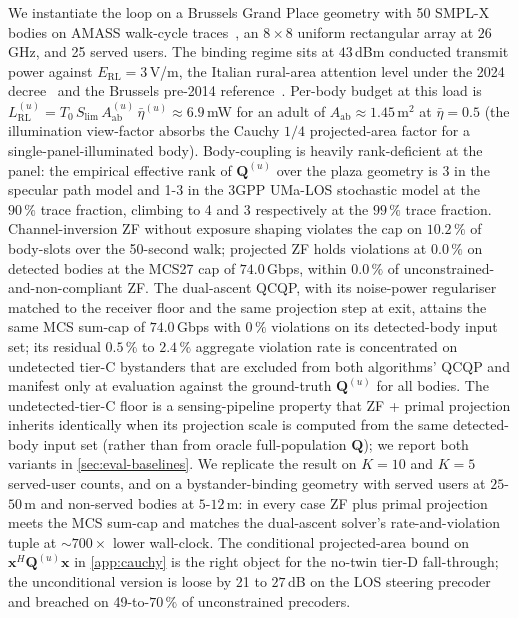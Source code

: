 \documentclass[journal,twocolumn,10pt]{IEEEtran}
\theoremstyle{plain}
\theoremstyle{remark}
\newcommand{\xx}{\mathbf{x}}
\newcommand{\Aab}{A_{\mathrm{ab}}}
\newcommand{\Qmat}{\mathbf{Q}}
\begin{document}
We instantiate the loop on a Brussels Grand Place geometry with
50 SMPL-X bodies on AMASS walk-cycle traces~\cite{SMPL,SMPLX,AMASS},
an $8\times 8$ uniform rectangular array at $26\,$GHz, and 25 served
users. The binding regime sits at $43\,$dBm conducted transmit power
against $E_{\mathrm{RL}} = 3\,$V/m, the Italian rural-area
attention level under the 2024 decree~\cite{ItalyDL} and the
Brussels pre-2014 reference~\cite{BrusselsArrete2007}. Per-body
budget at this load is $L^{(u)}_{\mathrm{RL}} =
T_0\,S_{\mathrm{lim}}\,\Aab^{(u)}\,\bar\eta^{(u)} \approx
6.9\,$mW for an adult of $\Aab \approx 1.45\,$m$^2$ at $\bar\eta =
0.5$ (the illumination view-factor absorbs the Cauchy $1/4$
projected-area factor for a single-panel-illuminated body).
Body-coupling is heavily rank-deficient at the panel: the empirical
effective rank of $\Qmat^{(u)}$ over the plaza geometry is 3 in the
specular path model and 1-3 in the 3GPP UMa-LOS stochastic model at
the $90\,\%$ trace fraction, climbing to 4 and 3 respectively at the
$99\,\%$ trace fraction. Channel-inversion ZF without exposure shaping
violates the cap on $10.2\,\%$ of body-slots over the 50-second walk;
projected ZF holds violations at $0.0\,\%$ on detected bodies at the
MCS27 cap of $74.0\,$Gbps, within $0.0\,\%$ of unconstrained-and-non-compliant
ZF. The dual-ascent QCQP, with its noise-power regulariser matched
to the receiver floor and the same projection step at exit, attains
the same MCS sum-cap of $74.0\,$Gbps with $0\,\%$ violations on its
detected-body input set; its residual $0.5\,\%$ to $2.4\,\%$
aggregate violation rate is concentrated on undetected
tier-C bystanders that are excluded from both algorithms' QCQP and
manifest only at evaluation against the ground-truth $\Qmat^{(u)}$
for all bodies. The undetected-tier-C floor is a sensing-pipeline
property that ZF + primal projection inherits identically when its
projection scale is computed from the same detected-body input set
(rather than from oracle full-population $\Qmat$); we report both
variants in \cref{sec:eval-baselines}. We replicate the result on
$K = 10$ and $K = 5$ served-user counts, and on a
bystander-binding geometry with served users at $25$-$50\,$m and
non-served bodies at $5$-$12\,$m: in every case ZF plus primal
projection meets the MCS sum-cap and matches the dual-ascent solver's
rate-and-violation tuple at $\sim 700\times$ lower wall-clock. The
conditional projected-area bound
on $\xx^H \Qmat^{(u)} \xx$ in \cref{app:cauchy} is the right object
for the no-twin tier-D fall-through; the unconditional version is
loose by 21 to $27\,$dB on the LOS steering precoder and breached
on 49-to-$70\,\%$ of unconstrained precoders.
\end{document}

